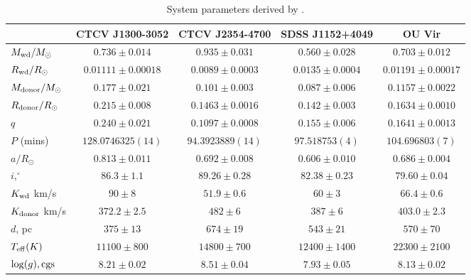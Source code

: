 \begin{landscape}
        \begin{table*}
            \centering
            \caption{System parameters derived by \citet{Savoury2011}.}
            \label{appendix:table:savoury system params}
            \begin{tabular}{lcccc}
                \hline
                ~                           & {\bf CTCV J1300-3052} & {\bf CTCV J2354-4700} & {\bf SDSS J1152+4049} & {\bf OU Vir}      \\
                \hline
                \hline
                $M_{\rm wd}/M_{\odot}$      & $0.736\pm0.014$       & $0.935\pm0.031$       & $0.560\pm0.028$   & $0.703\pm0.012$       \\
                $R_{\rm wd}/R_{\odot}$      & $0.01111\pm0.00018$   & $0.0089\pm0.0003$     & $0.0135\pm0.0004$ & $0.01191\pm0.00017$   \\
                $M_{\rm donor}/M_{\odot}$   & $0.177\pm0.021$       & $0.101\pm0.003$       & $0.087\pm0.006$   & $0.1157\pm0.0022$     \\
                $R_{\rm donor}/R_{\odot}$   & $0.215\pm0.008$       & $0.1463\pm0.0016$     & $0.142\pm0.003$   & $0.1634\pm0.0010$     \\
                $q$                         & $0.240\pm0.021$       & $0.1097\pm0.0008$     & $0.155\pm0.006$   & $0.1641\pm0.0013$     \\
                \hline
                $P$ (mins)                  & $128.0746325(14)$     & $94.3923889(14)$      & $97.518753(4)$    & $104.696803(7)$       \\
                $a/R_{\odot}$               & $0.813\pm0.011$       & $0.692\pm0.008$       & $0.606\pm0.010$   & $0.686\pm0.004$       \\
                $i, ^\circ$                 & $86.3\pm1.1$          & $89.26\pm0.28$        & $82.38\pm0.23$    & $79.60\pm0.04$        \\
                $K_{\rm wd}$ km/s           & $90\pm8$              & $51.9\pm0.6$          & $60\pm3$          &  $66.4\pm0.6$         \\
                $K_{\rm donor}$ km/s        & $372.2\pm2.5$         & $482\pm6$             & $387\pm6$         & $403.0\pm2.3$         \\
                \hline
                $d$, pc                     & $375\pm13$            & $674\pm19$            & $543\pm21$        & $570\pm70$            \\
                $T_{\rm eff} (K)$           & $11100\pm800$         & $14800\pm700$         & $12400\pm1400$    & $22300\pm2100$        \\
                $\log(g), {\rm cgs}$        & $8.21\pm0.02$         & $8.51\pm0.04$         & $7.93\pm0.05$     & $8.13\pm0.02$         \\
                \hline
                \hline
            \end{tabular}
        \end{table*}


\end{landscape}
